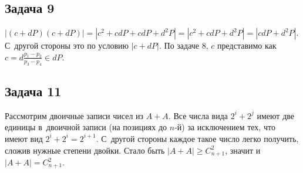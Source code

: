 \documentclass{article}
\begin{document}
\subsection*{Задача 9}
	$|(c + dP)(c + dP)| = |c^2 + cdP + cdP + d^2P| = |c^2 + cdP + d^2P| = |cdP +
	d^2P|$. С~другой стороны это по условию $|c + dP|$. По задаче 8,
	$c$ представимо как $c = d\frac{p_1 - p_2}{p_3 - p_4} \in dP$.



\subsection*{Задача 11}
	Рассмотрим двоичные записи чисел из $A + A$. Все числа вида $2^i + 2^j$ имеют
	две единицы в~двоичной записи (на позициях до $n$-й) за исключением тех, что
	имеют вид $2^i + 2^i = 2^{i+1}$. С~другой стороны каждое такое число легко
	получить, сложив нужные степени двойки. Стало быть $|A + A| \ge C_{n+1}^2$,
	значит и~$|A + A| = C_{n+1}^2$.
\end{document}
